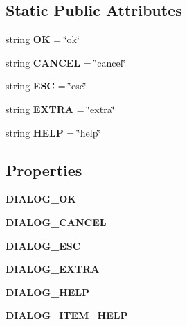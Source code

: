 \subsection*{Static Public Attributes}
\begin{DoxyCompactItemize}
\item 
string {\bfseries OK} = \char`\"{}ok\char`\"{}\hypertarget{class_libraries_1_1dialog_1_1_dialog_ac8f45eceb076a55f6e8189cb0d6ed375}{}\label{class_libraries_1_1dialog_1_1_dialog_ac8f45eceb076a55f6e8189cb0d6ed375}

\item 
string {\bfseries C\+A\+N\+C\+EL} = \char`\"{}cancel\char`\"{}\hypertarget{class_libraries_1_1dialog_1_1_dialog_ae267c67d8d6a8b743de17cf5fc01bc08}{}\label{class_libraries_1_1dialog_1_1_dialog_ae267c67d8d6a8b743de17cf5fc01bc08}

\item 
string {\bfseries E\+SC} = \char`\"{}esc\char`\"{}\hypertarget{class_libraries_1_1dialog_1_1_dialog_a71869cf2e8fe845824cba797529b83c0}{}\label{class_libraries_1_1dialog_1_1_dialog_a71869cf2e8fe845824cba797529b83c0}

\item 
string {\bfseries E\+X\+T\+RA} = \char`\"{}extra\char`\"{}\hypertarget{class_libraries_1_1dialog_1_1_dialog_a9e0af27a1d0f9b3fba8448af151bf487}{}\label{class_libraries_1_1dialog_1_1_dialog_a9e0af27a1d0f9b3fba8448af151bf487}

\item 
string {\bfseries H\+E\+LP} = \char`\"{}help\char`\"{}\hypertarget{class_libraries_1_1dialog_1_1_dialog_a75a7c887aba8c78e9bca6d402f3ab964}{}\label{class_libraries_1_1dialog_1_1_dialog_a75a7c887aba8c78e9bca6d402f3ab964}

\end{DoxyCompactItemize}
\subsection*{Properties}
\begin{DoxyCompactItemize}
\item 
{\bfseries D\+I\+A\+L\+O\+G\+\_\+\+OK}
\item 
{\bfseries D\+I\+A\+L\+O\+G\+\_\+\+C\+A\+N\+C\+EL}
\item 
{\bfseries D\+I\+A\+L\+O\+G\+\_\+\+E\+SC}
\item 
{\bfseries D\+I\+A\+L\+O\+G\+\_\+\+E\+X\+T\+RA}
\item 
{\bfseries D\+I\+A\+L\+O\+G\+\_\+\+H\+E\+LP}
\item 
{\bfseries D\+I\+A\+L\+O\+G\+\_\+\+I\+T\+E\+M\+\_\+\+H\+E\+LP}
\end{DoxyCompactItemize}


